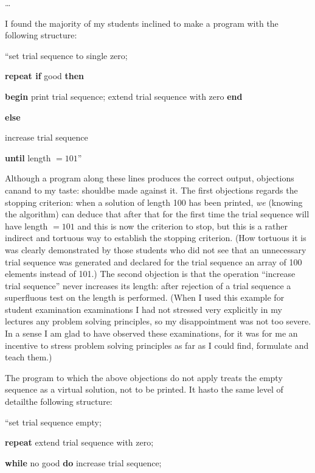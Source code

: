 \documentclass[twoside,11pt]{book}
\begin{document}
\dots

I found the majority of my students inclined to make a program with the following structure:

\hspace{-.4em}``set trial sequence to single zero;

\textbf{repeat if} good \textbf{then}

\quad \textbf{begin} print trial sequence; extend trial sequence with zero \textbf{end}

\quad\quad\quad \textbf{else}

\quad increase trial sequence

\textbf{until} length $= 101$''

Although a program along these lines produces the correct output, objections can\textemdash{}and to my taste: should\textemdash{}be made against it. The first objections regards the stopping criterion: when a solution of length 100 has been printed, \textit{we} (knowing the algorithm) can deduce that after that for the first time the trial sequence will have length $= 101$ and this is now the criterion to stop, but this is a rather indirect and tortuous way to establish the stopping criterion. (How tortuous it is was clearly demonstrated by those students who did not see that an unnecessary trial sequence was generated and declared for the trial sequence an array of 100 elements instead of 101.) The second objection is that the operation ``increase trial sequence'' never increases its length: after rejection of a trial sequence a superfluous test on the length is performed. (When I used this example for student examination examinations I had not stressed very explicitly in my lectures any problem solving principles, so my disappointment was not too severe. In a sense I am glad to have observed these examinations, for it was for me an incentive to stress problem solving principles as far as I could find, formulate and teach them.)

The program to which the above objections do not apply treats the empty sequence as a virtual solution, not to be printed. It has\textemdash{}to the same level of detail\textemdash{}the following structure:

\quad \hspace{-.4em}``set trial sequence empty;

\quad \textbf{repeat} extend trial sequence with zero;

\quad \quad \textbf{while} no good \textbf{do} increase trial sequence;
\end{document}
